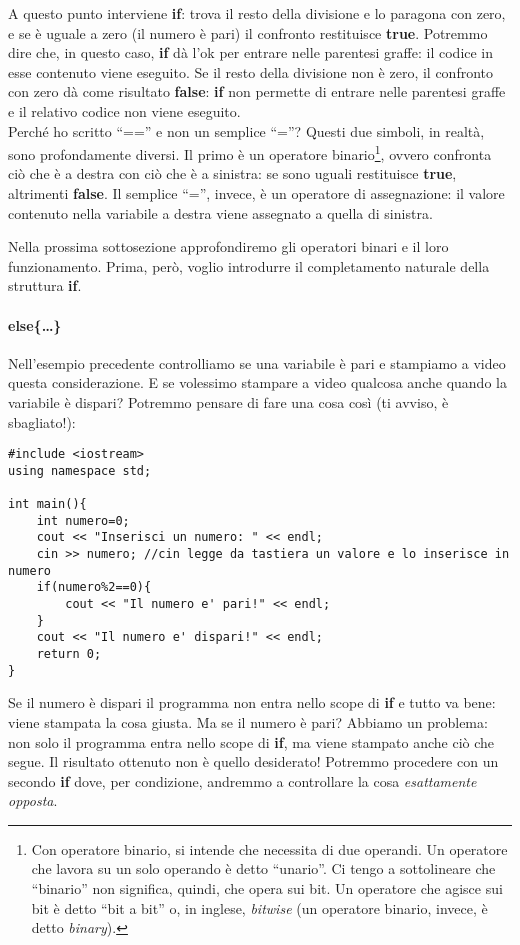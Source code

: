 A questo punto interviene \textbf{if}: trova il resto della divisione e lo paragona con zero, e se è uguale a zero (il numero è pari) il confronto restituisce \textbf{true}.  Potremmo dire che, in questo caso, \textbf{if} dà l'ok per entrare nelle parentesi graffe: il codice in esse contenuto viene eseguito. Se il resto della divisione non è zero, il confronto con zero dà come risultato \textbf{false}: \textbf{if} non permette di entrare nelle parentesi graffe e il relativo codice non viene eseguito.\\

Perché ho scritto ``=='' e non un semplice ``=''? Questi due simboli, in realtà, sono profondamente diversi. Il primo è un operatore binario\footnote{Con operatore binario, si intende che necessita di due operandi. Un operatore che lavora su un solo operando è detto ``unario''. Ci tengo a sottolineare che ``binario'' non significa, quindi, che opera sui bit. Un operatore che agisce sui bit è detto ``bit a bit'' o, in inglese, \emph{bitwise} (un operatore binario, invece, è detto \emph{binary}).}, ovvero confronta ciò che è a destra con ciò che è a sinistra: se sono uguali restituisce \textbf{true}, altrimenti \textbf{false}. Il semplice ``='', invece, è un operatore di assegnazione: il valore contenuto nella variabile a destra viene assegnato a quella di sinistra. 

Nella prossima sottosezione approfondiremo gli operatori binari e il loro funzionamento. Prima, però, voglio introdurre il completamento naturale della struttura \textbf{if}.

\paragraph{else\{\ldots\}} Nell'esempio precedente controlliamo se una variabile è pari e stampiamo a video questa considerazione. E se volessimo stampare a video qualcosa anche quando la variabile è dispari?
Potremmo pensare di fare una cosa così (ti avviso, è sbagliato!):
\begin{lstlisting}
#include <iostream>
using namespace std;
	
int main(){
	int numero=0;
	cout << "Inserisci un numero: " << endl;
	cin >> numero; //cin legge da tastiera un valore e lo inserisce in numero
	if(numero%2==0){
		cout << "Il numero e' pari!" << endl;
	}
	cout << "Il numero e' dispari!" << endl;
	return 0;
}
	\end{lstlisting}
Se il numero è dispari il programma non entra nello scope di \textbf{if} e tutto va bene: viene stampata la cosa giusta. Ma se il numero è pari? Abbiamo un problema: non solo il programma entra nello scope di \textbf{if}, ma viene stampato anche ciò che segue. Il risultato ottenuto non è quello desiderato!
Potremmo procedere con un secondo \textbf{if} dove, per condizione, andremmo a controllare la cosa \emph{esattamente opposta}. 
	
